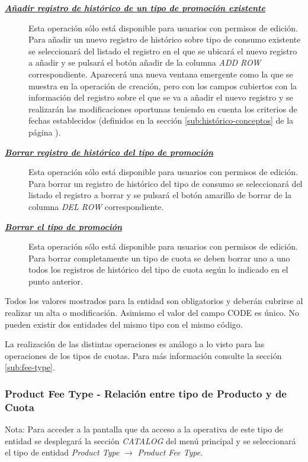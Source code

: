 \begin{description}
\item[\underline{\textsl{\textbf{Añadir registro de histórico de un tipo de promoción existente}}}] Esta operación sólo está disponible para usuarios con permisos de edición.
Para añadir un nuevo registro de histórico sobre tipo de consumo existente se seleccionará del listado el registro en el que se ubicará el nuevo registro a añadir 
y se pulsará el botón añadir de la columna \textit{ADD ROW} correspondiente. Aparecerá una nueva ventana emergente como la que se muestra en la operación de creación, pero con los campos cubiertos con la información del registro sobre el que se va a añadir el nuevo registro y se realizarán las modificaciones oportunas teniendo en cuenta los criterios de fechas establecidos (definidos en la sección \ref{sub:histórico-conceptos} de la página \pageref{sub:histórico-conceptos}).

\item[\underline{\textsl{\textbf{Borrar registro de histórico del tipo de promoción}}}] Esta operación sólo está disponible para usuarios con permisos de edición.
Para borrar un registro de histórico del tipo de consumo se seleccionará del listado el registro a borrar y se pulsará el botón amarillo de borrar de la columna \textit{DEL ROW} correspondiente.

\item[\underline{\textsl{\textbf{Borrar el tipo de promoción}}}] Esta operación sólo está disponible para usuarios con permisos de edición.
Para borrar completamente un tipo de cuota se deben borrar uno a uno todos los registros de histórico del tipo de cuota según lo indicado en el punto anterior.
\end{description}

Todos los valores mostrados para la entidad son obligatorios y deberán cubrirse al realizar un alta o modificación. Asimismo el valor del campo CODE es único. No pueden existir dos entidades del mismo tipo con el mismo código.

La realización de las distintas operaciones es análogo a lo visto para las operaciones de los tipos de cuotas. Para más información consulte la sección \ref{sub:fee-type}.


\subsubsection{Product Fee Type - Relación entre tipo de Producto y de Cuota}
\label{sub:product-fee-type-relation}

Nota: Para acceder a la pantalla que da acceso a la operativa de este tipo de entidad se desplegará la sección \emph{CATALOG} del menú principal y se seleccionará el tipo de entidad \emph{Product Type} $\rightarrow$  \emph{Product Fee Type}.


